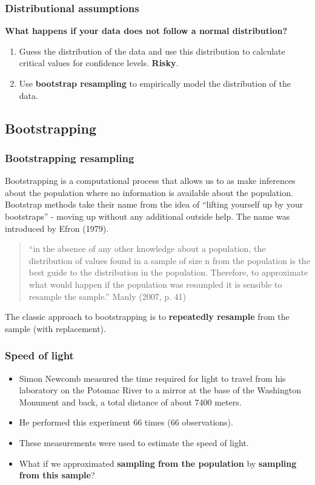 \documentclass[a4paper]{article}
\begin{document}
\subsubsection{Distributional assumptions}
\begin{greenbox}
	\textbf{What happens if your data does not follow a normal distribution?}
\end{greenbox}
\begin{enumerate}
	\item Guess the distribution of the data and use this distribution to calculate critical values for confidence levels. \textcolor{myred}{\textbf{Risky}}.
	\item Use \textcolor{mygreen}{\textbf{bootstrap resampling}} to empirically model the distribution of the data.
\end{enumerate}
\subsection{Bootstrapping}
\subsubsection{Bootstrapping resampling}
Bootstrapping is a computational process that allows us to as make inferences about the population where no information is available about the population.
Bootstrap methods take their name from the idea of ``lifting yourself up by your bootstraps'' - moving up without any additional outside help. The name was introduced by Efron (1979).
\begin{quote}
	``in the absence of any other knowledge about a population, the distribution of values found in a sample of size n from the population is the best guide to the distribution in the population. Therefore, to approximate what would happen if the population was resampled it is sensible to resample the sample.'' Manly (2007, p. 41)
\end{quote}
The classic approach to bootstrapping is to \textcolor{mygreen}{\textbf{repeatedly resample}} from the sample (with replacement).
\subsubsection{Speed of light}
\begin{itemize}
	\item Simon Newcomb measured the time required for light to travel from his laboratory on the Potomac River to a mirror at the base of the Washington Monument and back, a total distance of about 7400 meters.
	\item He performed this experiment 66 times (66 observations).
	\item These measurements were used to estimate the speed of light.
	\item What if we approximated \textbf{sampling from the population} by \textbf{sampling from this sample\textbf{}}?
\end{itemize}
\end{document}
